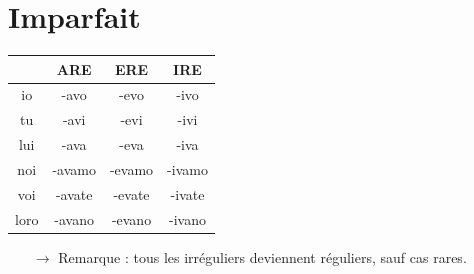 \documentclass[12pt, openany]{report}
\begin{document}
\section{Imparfait}
\begin{center}
    \begin{tabular}{c|c|c|c}
        & ARE & ERE & IRE\\ \hline
        io & -avo & -evo & -ivo\\
        tu & -avi & -evi & -ivi\\
        lui & -ava & -eva & -iva\\
        noi & -avamo & -evamo & -ivamo\\
        voi & -avate & -evate & -ivate\\
        loro & -avano & -evano & -ivano\\
    \end{tabular}
\end{center}
\begin{itemize}
    \item [$\rightarrow$] Remarque : tous les irréguliers deviennent réguliers, sauf cas rares.
\end{itemize}
\end{document}
